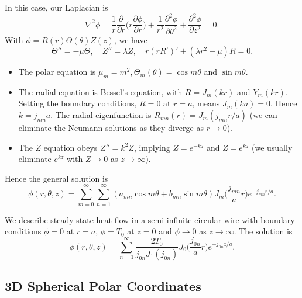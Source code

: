 \documentclass[12pt]{article}
\begin{document}
In this case, our Laplacian is
\[
	\nabla^2 \phi = \frac{1}{r} \frac{\partial}{\partial r} \biggl( r \frac{\partial \phi}{\partial r} \biggr) + \frac{1}{r^2} \frac{\partial^2 \phi}{\partial \theta^2} + \frac{\partial^2 \phi}{\partial z^2} = 0
.\]
With $\phi = R(r) \Theta(\theta) Z(z)$, we have
\[
	\Theta'' = - \mu \Theta, \quad Z'' = \lambda Z,\quad r(rR')' + (\lambda r^2 - \mu)R = 0
.\]
\begin{itemize}
	\item The polar equation is $\mu_m = m^2, \Theta_m(\theta) = \cos m \theta$ and $\sin m \theta$.
	\item The radial equation is Bessel's equation, with $R = J_m(kr)$ and $Y_m(kr)$. Setting the boundary conditions, $R = 0$ at $r = a$, means $J_m(ka) = 0$. Hence $k = j_{mn}a$. The radial eigenfunction is $R_{mn}(r) = J_m(j_{mn}r/a)$ (we can eliminate the Neumann solutions as they diverge as $r \to 0$).
	\item The $Z$ equation obeys $Z'' = k^2 Z$, implying $Z = e^{-kz}$ and $Z = e^{kz}$ (we usually eliminate $e^{kz}$ with $Z \to 0$ as $z \to \infty)$.
\end{itemize}
Hence the general solution is
\[
	\phi(r, \theta, z) = \sum_{m = 0}^{\infty} \sum_{n = 1}^{\infty} (a_{mn} \cos m \theta + b_{mn} \sin m \theta) J_{m} \biggl( \frac{j_{mn}}{a} r \biggr) e^{-j_{mn}r/a}
.\]

\begin{exbox}
	We describe steady-state heat flow in a semi-infinite circular wire with boundary conditions $\phi = 0$ at $r = a$, $\phi = T_0$ at $z = 0$ and $\phi \to 0$ as $z \to \infty$. The solution is
	\[
		\phi(r, \theta, z) = \sum_{n = 1}^{\infty} \frac{2T_0}{j_{0n}J_1(j_{0n})}J_0\biggl(\frac{j_{0n}}{a}r\biggr)e^{-j_{0n}z/a}
	.\]
\end{exbox}

\subsection{3D Spherical Polar Coordinates}%
\label{sub:3d_spherical_polar_coordinates}
\end{document}
